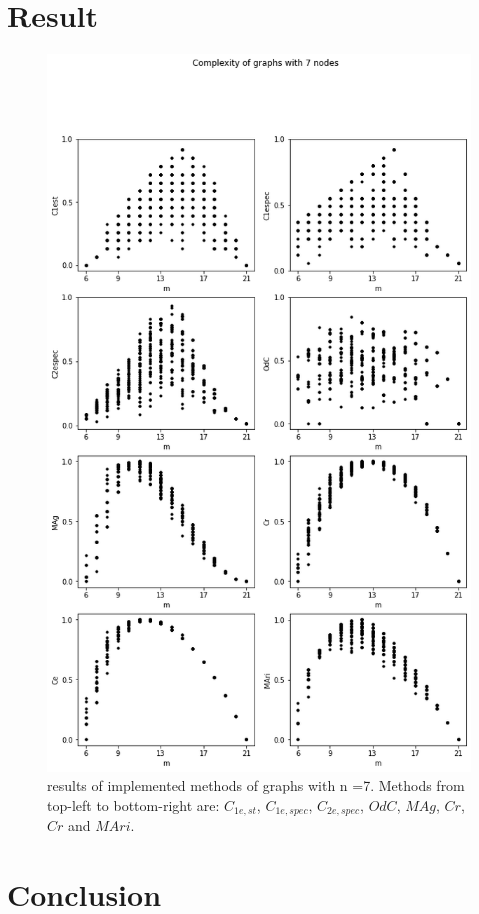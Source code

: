 \documentclass[12pt]{article}
\begin{document}
\section{Result}
\clearpage
\begin{figure}[ht]
    \includegraphics[width=\textwidth]{complexities_n=7.png}
    \centering
    \caption{results of implemented methods of graphs with n =7. Methods from top-left to bottom-right are: $C_{1e,st}$, $C_{1e,spec}$, $C_{2e,spec}$, $OdC$, $MAg$, $Cr$, $Cr$ and $MAri$.}
\end{figure}
\section{Conclusion}

\printbibliography
\end{document}
